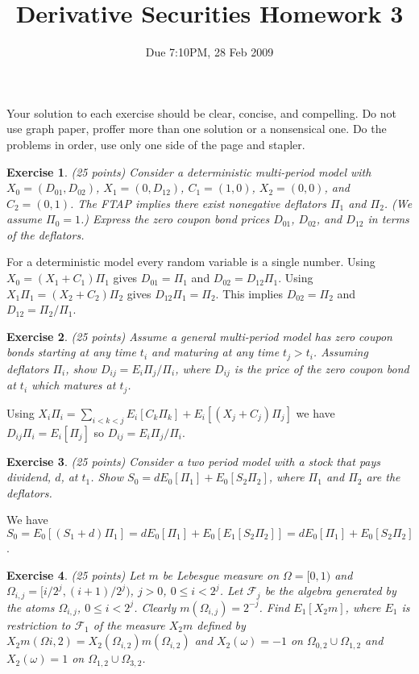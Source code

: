 \documentclass[11pt,fleqn]{amsproc}
\newcommand{\F}{\mathcal{F}}
\newtheorem{xca}{Exercise}
\begin{document}
\title{Derivative Securities Homework 3}
\author{Due 7:10PM, 28 Feb 2009}

\maketitle

Your solution to each exercise should be clear, concise, and compelling.
Do not use graph paper, proffer more than one solution or a nonsensical one.
Do the problems in order, use only one side of the page and stapler.

\begin{xca}{(25 points)}
Consider a deterministic multi-period model with $X_0 = (D_{01}, D_{02})$,
$X_1 = (0, D_{12})$, $C_1 = (1, 0)$, $X_2 = (0, 0)$, and $C_2 = (0, 1)$.
The FTAP implies there exist nonegative deflators $\Pi_1$ and $\Pi_2$. (We
assume $\Pi_0 = 1$.) Express the zero coupon bond prices $D_{01}$,
$D_{02}$, and $D_{12}$ in terms of the deflators.

\end{xca}

For a deterministic model every random variable is a single number.
Using $X_0 = (X_1 + C_1)\Pi_1$ gives $D_{01} = \Pi_1$ and $D_{02} =
D_{12}\Pi_1$. Using $X_1\Pi_1 = (X_2 + C_2)\Pi_2$ gives $D_{12}\Pi_1 =
\Pi_2$. This implies $D_{02} = \Pi_2$ and $D_{12} = \Pi_2/\Pi_1$.

\begin{xca}{(25 points)}
Assume a general multi-period model has zero coupon bonds starting
at any time $t_i$ and maturing at any time $t_j > t_i$. Assuming
deflators $\Pi_i$, show $D_{ij} = E_i \Pi_j/\Pi_i$, where $D_{ij}$ is the
price of the zero coupon bond at $t_i$ which matures at $t_j$.
\end{xca}

Using $X_i\Pi_i = \sum_{i < k < j} E_i[C_k\Pi_k] + E_i[(X_j + C_j)\Pi_j]$
we have $D_{ij}\Pi_i = E_i[\Pi_j]$ so $D_{ij} = E_i \Pi_j/\Pi_i$.

\begin{xca}{(25 points)}
Consider a two period model with a stock that pays dividend, $d$, at $t_1$.
Show $S_0 = dE_0[\Pi_1] + E_0[S_2\Pi_2]$, where $\Pi_1$ and
$\Pi_2$ are the deflators.

\end{xca}

We have $S_0 = E_0[(S_1 + d)\Pi_1] = dE_0[\Pi_1] + E_0[E_1[S_2\Pi_2]]
= dE_0[\Pi_1] + E_0[S_2\Pi_2]$.

\begin{xca}{(25 points)}
Let $m$ be Lebesgue measure on $\Omega = [0, 1)$ and $\Omega_{i,j}
= [i/2^j, (i + 1)/2^j)$, $j > 0$, $0 \le i < 2^j$.  Let $\F_j$
be the algebra generated by the atoms $\Omega_{i,j}$, $0\le i <
2^j$. Clearly $m(\Omega_{i,j}) = 2^{-j}$. Find $E_1[X_2m]$, where
$E_1$ is restriction to $\F_1$ of the measure $X_2m$ defined by
$X_2m(\Omega{i,2}) = X_2(\Omega_{i,2})m(\Omega_{i,2})$ and $X_2(\omega)
= -1$ on $\Omega_{0,2}\cup\Omega_{1,2}$ and $X_2(\omega) = 1$ on
$\Omega_{1,2}\cup\Omega_{3,2}$.

\end{xca}
\end{document}
